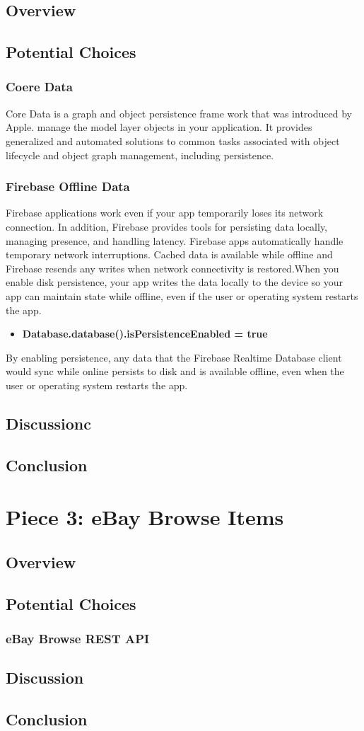 \documentclass[onecolumn, draftclsnofoot,10pt, compsoc]{IEEEtran}
\begin{document}
\subsection{Overview}
\subsection{Potential Choices}
\subsubsection{Coere Data}
\par Core Data is a graph and object persistence frame work that was introduced by Apple. manage the model layer objects in your application. It provides generalized and automated solutions to common tasks associated with object lifecycle and object graph management, including persistence.
\subsubsection{Firebase Offline Data}
\par Firebase applications work even if your app temporarily loses its network connection. In addition, Firebase provides tools for persisting data locally, managing presence, and handling latency. Firebase apps automatically handle temporary network interruptions. Cached data is available while offline and Firebase resends any writes when network connectivity is restored.When you enable disk persistence, your app writes the data locally to the device so your app can maintain state while offline, even if the user or operating system restarts the app.
\begin{itemize}
\item \textbf{Database.database().isPersistenceEnabled = true}
\end{itemize}
By enabling persistence, any data that the Firebase Realtime Database client would sync while online persists to disk and is available offline, even when the user or operating system restarts the app.
\subsection{Discussionc}
\subsection{Conclusion}

\section{Piece 3: eBay Browse Items}
\subsection{Overview}
\subsection{Potential Choices}
\subsubsection{eBay Browse REST API}
\subsection{Discussion}
\subsection{Conclusion}
\end{document}

